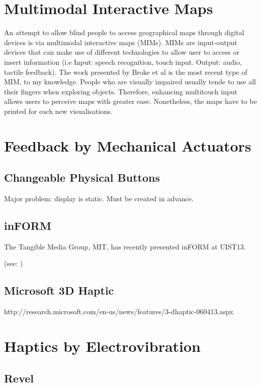 \section{Multimodal Interactive Maps}
An attempt to allow blind people to access geographical maps through digital devices is via multimodal interactive maps (MIMs). MIMs are input-output devices that can make use of different technologies to allow user to access or insert information (i.e Input: speech recognition, touch input. Output: audio, tactile feedback). The work presented by Broke et al \cite{brock2010usage} is the most recent type of MIM, to my knowledge. People who are visually impaired usually tende to use all their fingers when exploring objects. Therefore, enhancing multitouch input allows users to perceive maps with greater ease. Nonetheless, the maps have to be printed for each new visualisations. 

\section{Feedback by Mechanical Actuators}

\subsection{Changeable Physical Buttons}

Major problem: display is static. Must be created in advance.

\subsection{inFORM}

The Tangible Media Group, MIT, has recently presented inFORM at UIST13. 

(see: \cite{follmer2013inform})

\subsection{Microsoft 3D Haptic}

http://research.microsoft.com/en-us/news/features/3-dhaptic-060413.aspx

\section{Haptics by Electrovibration}


\subsection{Revel}

